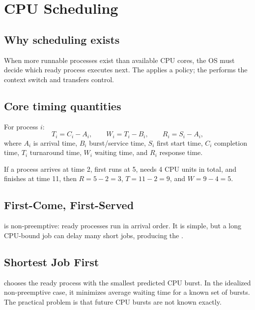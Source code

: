 \chapter{CPU Scheduling}\label{ch:scheduling}

\section{Why scheduling exists}
When more runnable processes exist than available CPU cores, the OS must decide which ready process executes next. The  applies a policy; the  performs the context switch and transfers control.

\section{Core timing quantities}
For process $i$:
\[
T_i = C_i - A_i, \qquad W_i = T_i - B_i, \qquad R_i = S_i - A_i,
\]
where $A_i$ is arrival time, $B_i$ burst/service time, $S_i$ first start time, $C_i$ completion time, $T_i$ turnaround time, $W_i$ waiting time, and $R_i$ response time.

\begin{workedexample}
If a process arrives at time 2, first runs at 5, needs 4 CPU units in total, and finishes at time 11, then $R=5-2=3$, $T=11-2=9$, and $W=9-4=5$.
\end{workedexample}

\section{First-Come, First-Served}
 is non-preemptive: ready processes run in arrival order. It is simple, but a long CPU-bound job can delay many short jobs, producing the .

\section{Shortest Job First}
 chooses the ready process with the smallest predicted CPU burst. In the idealized non-preemptive case, it minimizes average waiting time for a known set of bursts. The practical problem is that future CPU bursts are not known exactly.

